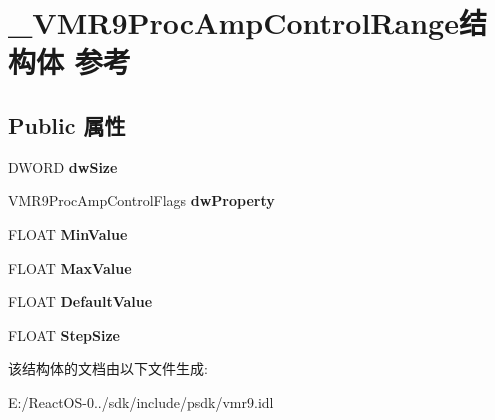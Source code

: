 \hypertarget{struct___v_m_r9_proc_amp_control_range}{}\section{\+\_\+\+V\+M\+R9\+Proc\+Amp\+Control\+Range结构体 参考}
\label{struct___v_m_r9_proc_amp_control_range}
\subsection*{Public 属性}
\begin{DoxyCompactItemize}
\item 
\mbox{\label{struct___v_m_r9_proc_amp_control_range_ab6b9141954ef58eb15cad0fccc991635}} 
D\+W\+O\+RD {\bfseries dw\+Size}
\item 
\mbox{\label{struct___v_m_r9_proc_amp_control_range_a26beb154e71f2d9340eb10a949eeabfc}} 
V\+M\+R9\+Proc\+Amp\+Control\+Flags {\bfseries dw\+Property}
\item 
\mbox{\label{struct___v_m_r9_proc_amp_control_range_a609570282565fa757000d471edaeb716}} 
F\+L\+O\+AT {\bfseries Min\+Value}
\item 
\mbox{\label{struct___v_m_r9_proc_amp_control_range_a81658a689464f054dfc0381f85c35640}} 
F\+L\+O\+AT {\bfseries Max\+Value}
\item 
\mbox{\label{struct___v_m_r9_proc_amp_control_range_aa5d10caf39fee03e132b828a14b9074b}} 
F\+L\+O\+AT {\bfseries Default\+Value}
\item 
\mbox{\label{struct___v_m_r9_proc_amp_control_range_adaad43bf7ff90c7798c96bf3b4b8e104}} 
F\+L\+O\+AT {\bfseries Step\+Size}
\end{DoxyCompactItemize}


该结构体的文档由以下文件生成\+:\begin{DoxyCompactItemize}
\item 
E\+:/\+React\+O\+S-\/0../sdk/include/psdk/vmr9.\+idl\end{DoxyCompactItemize}
